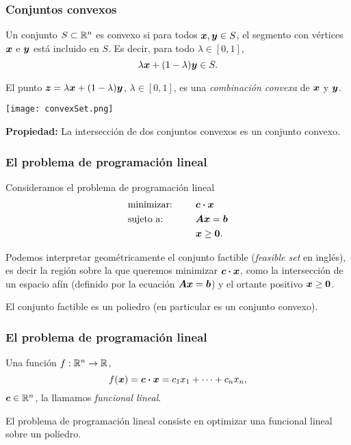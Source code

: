 \documentclass[aspectratio=169,12pt,spanish]{beamer}
\begin{document}

\begin{frame}
\frametitle{Conjuntos convexos}

\begin{definition}
Un conjunto $S \subset \mathbb{R}^n$ es convexo si para todos $\bm{x}, \bm{y} \in S$, el segmento con vértices $\bm{x}$ e $\bm{y}$ está incluido en $S$. Es decir, para todo $\lambda \in [0, 1]$,
$$
\lambda \bm{x} + (1-\lambda) \bm{y} \in S.
$$
\end{definition}

El punto $\bm{z} = \lambda \bm{x} + (1-\lambda) \bm{y}$, $\lambda \in [0, 1]$, es una \emph{combinación convexa} de $\bm{x}$ y $\bm{y}$.

\begin{center}
\texttt{[image: convexSet.png]}
\end{center}


\textbf{Propiedad:} La intersección de dos conjuntos convexos es un conjunto convexo.


\end{frame}


\begin{frame}
\frametitle{El problema de programación lineal}

Consideramos el problema de programación lineal
\begin{alignat*}{2}
  & \text{minimizar: } & & \bm{c} \boldsymbol{\cdot} \bm{x} \\
   & \text{sujeto a: } & \quad & \bm{A}\bm{x} = \bm{b} \\
   & & & \bm{x} \ge \bm{0}.
\end{alignat*}

Podemos interpretar geom\'etricamente el conjunto factible (\emph{feasible set} en ingl\'es), es decir la regi\'on sobre la que queremos minimizar $\bm{c} \boldsymbol{\cdot} \bm{x}$, como la intersecci\'on de un espacio af\'in (definido por la ecuaci\'on $\bm{A}\bm{x} = \bm{b}$) y el ortante positivo $\bm{x} \ge \bm{0}$.

El conjunto factible es un poliedro (en particular es un conjunto convexo).

\end{frame}


\begin{frame}
\frametitle{El problema de programación lineal}

Una función $f: \mathbb{R}^n \rightarrow \mathbb{R}$,
$$f(\bm{x}) = \bm{c} \boldsymbol{\cdot} \bm{x} = c_1 x_1 + \dots + c_n x_n,$$
$\bm{c} \in \mathbb{R}^n$, la llamamos \emph{funcional lineal}.

\begin{block}{}
El problema de programación lineal consiste en optimizar una funcional lineal sobre un poliedro.
\end{block}


\end{frame}
\end{document}
